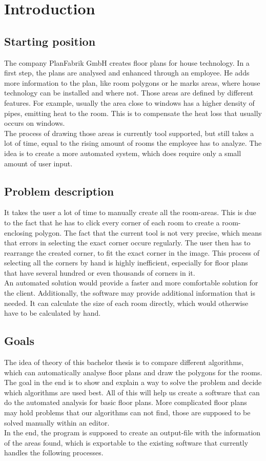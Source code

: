 \section{Introduction}
\subsection{Starting position}
The company PlanFabrik GmbH creates floor plans for house technology. In a first
step, the plans are analysed and enhanced through an employee. He adds more
information to the plan, like room polygons or he marks areas, where house technology
can be installed and where not. Those areas are defined by different features. For example, usually the area close to windows has a higher density of pipes, emitting heat to the room. This is to compensate the heat loss that usually occurs on windows.
\\
The process of drawing those areas is currently tool supported, but still takes a lot of time, equal to the rising amount of rooms the employee has to analyze. The idea is to create a more automated system, which does require only a small amount of user input.

\subsection{Problem description}
\label{sub:ProblemDescription}
It takes the user a lot of time to manually create all the room-areas. This is due to the fact that he has to click every corner of each room to create a room-enclosing polygon. The fact that the current tool is not very precise, which means that errors in selecting the exact corner occure regularly. The user then has to rearrange the created corner, to fit the exact corner in the image. This process of selecting all the corners by hand is highly inefficient, especially for floor plans that have several hundred or even thousands of corners in it.
\\
An automated solution would provide a faster and more comfortable solution for the client. Additionally, the software may provide additional information that is needed. It can calculate the size of each room directly, which would otherwise have to be calculated by hand.

\subsection{Goals}
The idea of theory of this bachelor thesis is to compare different algorithms, which can automatically analyse floor plans and draw the polygons for the rooms. The goal in the end is to show and explain a way to solve the problem and decide which algorithms are used best. All of this will help us create a software that can do the automated analysis for basic floor plans. More complicated floor plans may hold problems that our algorithms can not find, those are supposed to be solved manually within an editor.
\\
In the end, the program is supposed to create an output-file with the information of the areas found, which is exportable to the existing software that currently handles the following processes.

